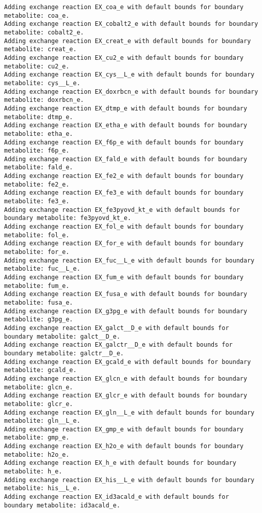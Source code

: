 \documentclass[
  letterpaper,
  DIV=11,
  numbers=noendperiod]{scrartcl}
\begin{document}
\begin{verbatim}
Adding exchange reaction EX_coa_e with default bounds for boundary metabolite: coa_e.
Adding exchange reaction EX_cobalt2_e with default bounds for boundary metabolite: cobalt2_e.
Adding exchange reaction EX_creat_e with default bounds for boundary metabolite: creat_e.
Adding exchange reaction EX_cu2_e with default bounds for boundary metabolite: cu2_e.
Adding exchange reaction EX_cys__L_e with default bounds for boundary metabolite: cys__L_e.
Adding exchange reaction EX_doxrbcn_e with default bounds for boundary metabolite: doxrbcn_e.
Adding exchange reaction EX_dtmp_e with default bounds for boundary metabolite: dtmp_e.
Adding exchange reaction EX_etha_e with default bounds for boundary metabolite: etha_e.
Adding exchange reaction EX_f6p_e with default bounds for boundary metabolite: f6p_e.
Adding exchange reaction EX_fald_e with default bounds for boundary metabolite: fald_e.
Adding exchange reaction EX_fe2_e with default bounds for boundary metabolite: fe2_e.
Adding exchange reaction EX_fe3_e with default bounds for boundary metabolite: fe3_e.
Adding exchange reaction EX_fe3pyovd_kt_e with default bounds for boundary metabolite: fe3pyovd_kt_e.
Adding exchange reaction EX_fol_e with default bounds for boundary metabolite: fol_e.
Adding exchange reaction EX_for_e with default bounds for boundary metabolite: for_e.
Adding exchange reaction EX_fuc__L_e with default bounds for boundary metabolite: fuc__L_e.
Adding exchange reaction EX_fum_e with default bounds for boundary metabolite: fum_e.
Adding exchange reaction EX_fusa_e with default bounds for boundary metabolite: fusa_e.
Adding exchange reaction EX_g3pg_e with default bounds for boundary metabolite: g3pg_e.
Adding exchange reaction EX_galct__D_e with default bounds for boundary metabolite: galct__D_e.
Adding exchange reaction EX_galctr__D_e with default bounds for boundary metabolite: galctr__D_e.
Adding exchange reaction EX_gcald_e with default bounds for boundary metabolite: gcald_e.
Adding exchange reaction EX_glcn_e with default bounds for boundary metabolite: glcn_e.
Adding exchange reaction EX_glcr_e with default bounds for boundary metabolite: glcr_e.
Adding exchange reaction EX_gln__L_e with default bounds for boundary metabolite: gln__L_e.
Adding exchange reaction EX_gmp_e with default bounds for boundary metabolite: gmp_e.
Adding exchange reaction EX_h2o_e with default bounds for boundary metabolite: h2o_e.
Adding exchange reaction EX_h_e with default bounds for boundary metabolite: h_e.
Adding exchange reaction EX_his__L_e with default bounds for boundary metabolite: his__L_e.
Adding exchange reaction EX_id3acald_e with default bounds for boundary metabolite: id3acald_e.

\end{verbatim}
\end{document}
